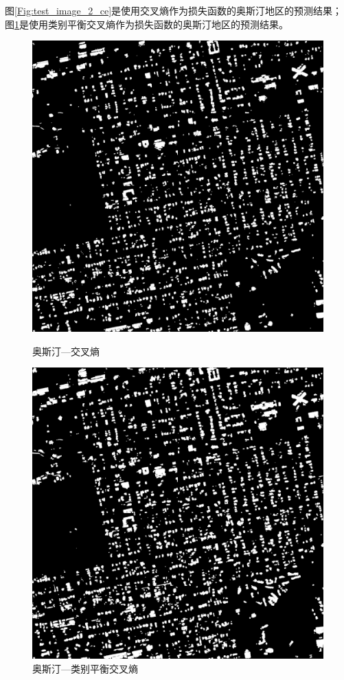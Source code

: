 图\ref{Fig:test_image_2_ce}是使用交叉熵作为损失函数的奥斯汀地区的预测结果；图\ref{Fig:test_image_2_cbce}是使用类别平衡交叉熵作为损失函数的奥斯汀地区的预测结果。
\begin{figure}[htbp]
    
    \centering
    \begin{minipage}[t]{0.49\linewidth}
        \centering
        \includegraphics[width=1\linewidth]{Figures/结果/austin29_交叉熵.png}
        \caption{奥斯汀—交叉熵}
        \label{Fig:test_image_2_ce}
    \end{minipage}
    \begin{minipage}[t]{0.49\linewidth}
        \centering
        \includegraphics[width=1\linewidth]{Figures/结果/austin29_平衡.png}
        \caption{奥斯汀—类别平衡交叉熵}
        \label{Fig:test_image_2_cbce}
    \end{minipage}
    

\end{figure}
